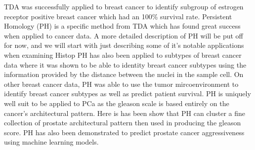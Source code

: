     TDA was successfully applied to breast cancer to identify subgroup of estrogen receptor positive breast cancer which
        had an 100\% survival rate. %
    Persistent Homology (PH) is a specific method from TDA which has found great success when applied to cancer data.
    A more detailed description of PH will be put off for now, and we will start with just describing some of it's notable
        applications when examining Histop
    PH has also been applied to subtypes of breast cancer data where it was shown to be able to identity breast cancer
        subtypes using the information provided by the distance between the nuclei in the sample cell.
    On other breast cancer data, PH was able to use the tumor mircoenvironment to identify breast cancer subtypes as
        well as predict patient survival.
    PH is uniquely well suit to be applied to PCa as the gleason scale is based entirely on the cancer's architectural
        pattern.
    Here is has been show that PH can cluster a fine collection of prostate architectural pattern then used in producing
        the gleason score.
    PH has also been demonstrated to predict prostate cancer aggressiveness using machine learning models.







